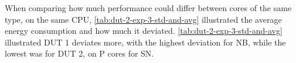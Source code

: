 

When comparing how much performance could differ between cores of the same type, on the same CPU, \cref{tab:dut-2-exp-3-std-and-avg} illustrated the average energy consumption and how much it deviated. \cref{tab:dut-2-exp-3-std-and-avg} illustrated DUT 1 deviates more, with the highest deviation for NB, while the lowest was for DUT 2, on P cores for SN.










